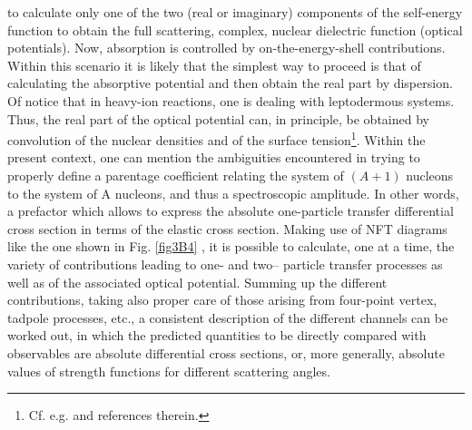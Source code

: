 to calculate only one of the two (real or imaginary)
components of the self-energy function to obtain the
full scattering, complex, nuclear dielectric function
(optical potentials). Now, absorption is controlled
by on-the-energy-shell contributions. Within this
scenario it is likely that the simplest way to proceed is
that of calculating the absorptive potential and then
obtain the real part by dispersion. Of notice that in heavy-ion reactions,
one is dealing with leptodermous systems. Thus, the
real part of the optical potential can, in principle, be
obtained by convolution of the nuclear densities and
of the surface tension\footnote{Cf. e.g. \cite{Broglia:04a} and references therein.}. Within the present context, one can mention the
ambiguities encountered in trying to properly define
a parentage coefficient relating the system of $(A +
1)$ nucleons to the system of A nucleons, and thus
a spectroscopic amplitude. In other words, a prefactor which allows to express the absolute one-particle transfer differential
cross section in terms of the elastic cross section.
Making use of NFT diagrams like the one shown
in Fig. \ref{fig3B4} , it is possible to calculate, one at a time,
the variety of contributions leading to one- and two-- particle
transfer processes as well as of the associated optical potential. Summing up the different
contributions, taking also proper care of those arising
from four-point vertex, tadpole processes, etc., a
consistent description of the different channels can be
worked out, in which the predicted quantities to be
directly compared with observables are absolute differential
cross sections, or, more generally, absolute
values of strength functions for different scattering
angles.
